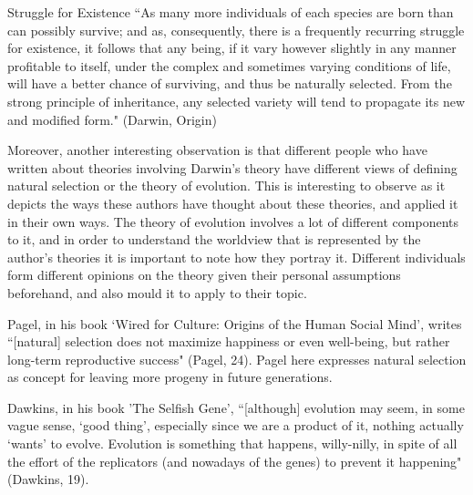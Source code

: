 \documentclass[11pt, oneside]{article}
\begin{document}
\par Struggle for Existence ``As many more individuals of each species are born than can possibly survive; and as, consequently, there is a frequently recurring struggle for existence, it follows that any being, if it vary however slightly in any manner profitable to itself, under the complex and sometimes varying conditions of life, will have a better chance of surviving, and thus be naturally selected. From the strong principle of inheritance, any selected variety will tend to propagate its new and modified form." (Darwin, Origin)





\par Moreover, another interesting observation is that different people who have written about theories involving Darwin's theory have different views of defining natural selection or the theory of evolution. This is interesting to observe as it depicts the ways these authors have thought about these theories, and applied it in their own ways. The theory of evolution involves a lot of different components to it, and in order to understand the worldview that is represented by the author's theories it is important to note how they portray it. Different individuals form different opinions on the theory given their personal assumptions beforehand, and also mould it to apply to their topic.

\par Pagel, in his book `Wired for Culture: Origins of the Human Social Mind', writes ``[natural] selection does not maximize happiness or even well-being, but rather long-term reproductive success" (Pagel, 24). Pagel here expresses natural selection as concept for leaving more progeny in future generations. 

\par Dawkins, in his book 'The Selfish Gene', ``[although] evolution may seem, in some vague sense, `good thing', especially since we are a product of it, nothing actually `wants' to evolve. Evolution is something that happens, willy-nilly, in spite of all the effort of the replicators (and nowadays of the genes) to prevent it happening" (Dawkins, 19).



\end{document}
